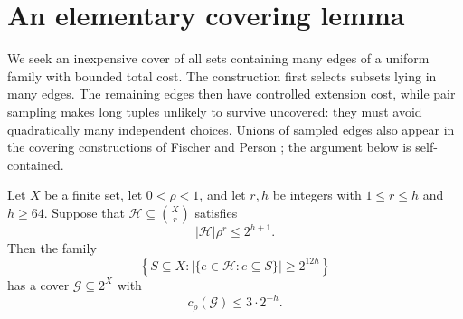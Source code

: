 \section{An elementary covering lemma}
\label{sec:covering}

We seek an inexpensive cover of all sets containing many edges of a
uniform family with bounded total cost. The construction first selects
subsets lying in many edges. The remaining edges then have controlled
extension cost, while pair sampling makes long tuples unlikely to survive
uncovered: they must avoid quadratically many independent choices.
Unions of sampled edges also
appear in the covering constructions of Fischer and Person
\cite[Sections~1.1 and~2]{FischerPerson25}; the argument below is self-contained.

\begin{lemma}\label{lem:covering}
Let \(X\) be a finite set, let \(0<\rho<1\), and let \(r,h\) be integers
with \(1\le r\le h\) and \(h\ge64\). Suppose that
\(\mathcal H\subseteq\binom{X}{r}\) satisfies
\[
|\mathcal H|\rho^r\le2^{h+1}.
\]
Then the family
\[
\left\{S\subseteq X:
  |\{e\in\mathcal H:e\subseteq S\}|\ge2^{12h}\right\}
\]
has a cover \(\mathcal G\subseteq2^X\) with
\[
c_\rho(\mathcal G)\le3\cdot2^{-h}.
\]
\end{lemma}

